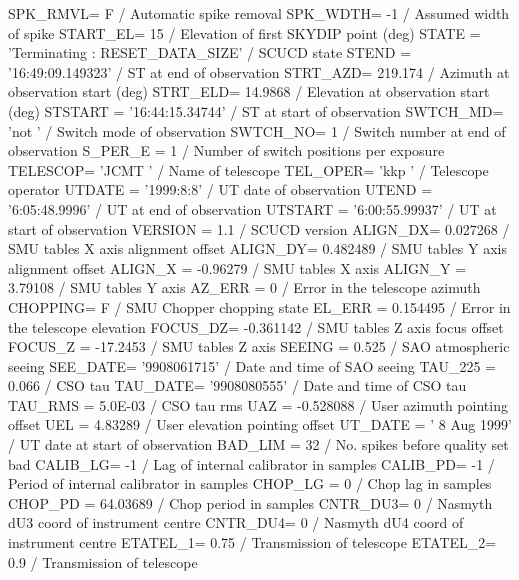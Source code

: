 \documentclass[twoside,11pt,nolof]{starlink}
\begin{document}
\begin{small}
\begin{terminalv}
SPK_RMVL=                    F / Automatic spike removal
SPK_WDTH=                   -1 / Assumed width of spike
START_EL=                   15 / Elevation of first SKYDIP point (deg)
STATE   = 'Terminating         :   RESET_DATA_SIZE' / SCUCD state
STEND   = '16:49:09.149323'    / ST at end of observation
STRT_AZD=              219.174 / Azimuth at observation start (deg)
STRT_ELD=              14.9868 / Elevation at observation start (deg)
STSTART = '16:44:15.34744'     / ST at start of observation
SWTCH_MD= 'not     '           / Switch mode of observation
SWTCH_NO=                    1 / Switch number at end of observation
S_PER_E =                    1 / Number of switch positions per exposure
TELESCOP= 'JCMT    '           / Name of telescope
TEL_OPER= 'kkp     '           / Telescope operator
UTDATE  = '1999:8:8'           / UT date of observation
UTEND   = '6:05:48.9996'       / UT at end of observation
UTSTART = '6:00:55.99937'      / UT at start of observation
VERSION =                  1.1 / SCUCD version
ALIGN_DX=             0.027268 / SMU tables X axis alignment offset
ALIGN_DY=             0.482489 / SMU tables Y axis alignment offset
ALIGN_X =             -0.96279 / SMU tables X axis
ALIGN_Y =              3.79108 / SMU tables Y axis
AZ_ERR  =                    0 / Error in the telescope azimuth
CHOPPING=                    F / SMU Chopper chopping state
EL_ERR  =             0.154495 / Error in the telescope elevation
FOCUS_DZ=            -0.361142 / SMU tables Z axis focus offset
FOCUS_Z =             -17.2453 / SMU tables Z axis
SEEING  =                0.525 / SAO atmospheric seeing
SEE_DATE= '9908061715'         / Date and time of SAO seeing
TAU_225 =                0.066 / CSO tau
TAU_DATE= '9908080555'         / Date and time of CSO tau
TAU_RMS =              5.0E-03 / CSO tau rms
UAZ     =            -0.528088 / User azimuth pointing offset
UEL     =              4.83289 / User elevation pointing offset
UT_DATE = ' 8 Aug 1999'        / UT date at start of observation
BAD_LIM =                   32 / No. spikes before quality set bad
CALIB_LG=                   -1 / Lag of internal calibrator in samples
CALIB_PD=                   -1 / Period of internal calibrator in samples
CHOP_LG =                    0 / Chop lag in samples
CHOP_PD =             64.03689 / Chop period in samples
CNTR_DU3=                    0 / Nasmyth dU3 coord of instrument centre
CNTR_DU4=                    0 / Nasmyth dU4 coord of instrument centre
ETATEL_1=                 0.75 / Transmission of telescope
ETATEL_2=                  0.9 / Transmission of telescope

\end{terminalv}
\end{small}
\end{document}
